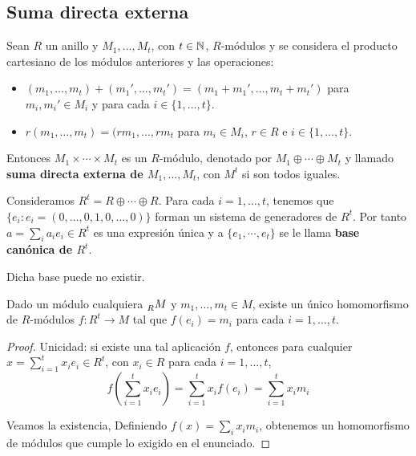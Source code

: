 \subsection{Suma directa externa}

\begin{prop}
  Sean \(R\) un anillo y \(M_1, \ldots, M_t\), con \(t \in \mathbb{N}\), \(R\)-módulos y se considera
  el producto cartesiano de los módulos anteriores y las operaciones:
  \begin{itemize}
  \item \((m_1, \ldots, m_t) + (m_1', \ldots, m_t') = (m_1 + m_1', \ldots, m_t + m_t')\)
    para \(m_i, m_i' \in M_i\) y para cada \(i \in \{1, \ldots, t\}\). 
  \item \(r(m_1, \ldots, m_t) = (rm_1, \ldots, rm_t\) para \(m_i \in M_i\), \(r \in R\) e
    \(i \in \{1, \ldots, t\}\).
  \end{itemize}

  Entonces \(M_1 \times \cdots \times M_t\) es un \(R\)-módulo, denotado por \(M_1
  \oplus \cdots \oplus M_t\) y llamado \textbf{suma directa externa de \(M_1,\ldots, M_t\)},
  con \(M^t\) si son todos iguales.
\end{prop}

\begin{df}
  Consideramos \(R^t=R\oplus\cdots\oplus R\). Para cada \(i=1,\ldots, t\), tenemos que
  \(\{e_i: e_i=(0,\ldots, 0,1,0, \ldots, 0)\}\) forman un sistema de
  generadores de \(R^t\). Por tanto \(a=\sum_i a_i e_i\in R^t\)
  es una expresión única y a \(\{e_1, \cdots, e_t\}\) se le llama \textbf{base canónica
    de \(R^t\)}.
\end{df}

Dicha base puede no existir.

\begin{prop}
  Dado un módulo cualquiera \(\prescript{}{R}{M}\) y \(m_1, \ldots, m_t\in M\),
  existe un único homomorfismo de \(R\)-módulos \(f:R^t \longrightarrow M\)
  tal que \(f(e_i)=m_i\) para cada \(i = 1, \ldots, t\).
\end{prop}

\begin{proof}
  Unicidad: si existe una tal aplicación \(f\), entonces para
  cualquier \(x = \sum_{i=1}^tx_ie_i \in R^t\), con \(x_i \in R\) para cada \(i = 1, \ldots,
  t\),
  \[
    f(\sum_{i=1}^{t}x_ie_i) = \sum_{i=1}^t x_i f(e_i)=\sum_{i=1}^t x_i m_i
  \]

  Veamos la existencia,
  Definiendo \(f(x)=\sum_i x_i m_i\), obtenemos un homomorfismo de módulos
  que cumple lo exigido en el enunciado.
\end{proof}

